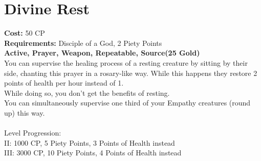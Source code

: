 \section{Divine Rest}
\textbf{Cost:} 50 CP\\
\textbf{Requirements:} Disciple of a God, 2 Piety Points \\
\textbf{Active, Prayer, Weapon, Repeatable, Source(25 Gold)}\\
You can supervise the healing process of a resting creature by sitting by their side, chanting this prayer in a rosary-like way. While this happens they restore 2 points of health per hour instead of 1.\\
While doing so, you don't get the benefits of resting.\\
You can simultaneously supervise one third of your Empathy creatures (round up) this way.\\
\\
Level Progression:\\
II: 1000 CP, 5 Piety Points, 3 Points of Health instead\\
III: 3000 CP, 10 Piety Points, 4 Points of Health instead\\